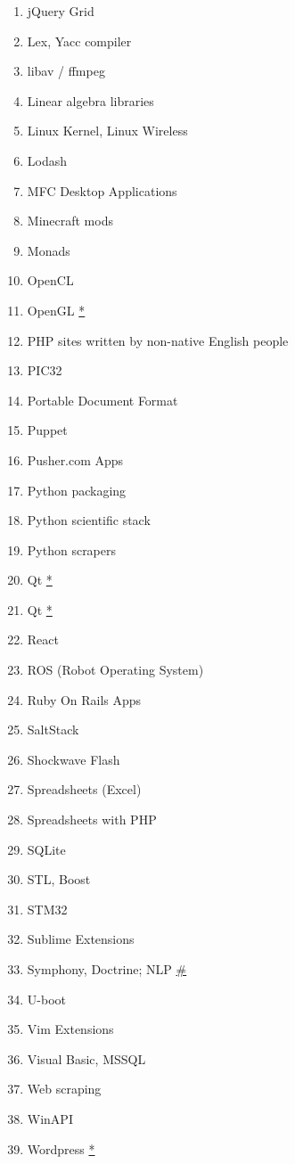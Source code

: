 \documentclass[conference,10pt]{IEEEtran}
\begin{document}
\begin{figure}[H]
\begin{multicols}{2}
\begin{enumerate}
    \item jQuery Grid
    \item Lex, Yacc compiler
    \item libav / ffmpeg
    \item Linear algebra libraries
    \item Linux Kernel, Linux Wireless
    \item Lodash
    \item MFC Desktop Applications 
    \item Minecraft mods
    \item Monads
    \item OpenCL
    \item OpenGL \hyperref[duplicate]{*}
    \item PHP sites written by non-native English people
    \item PIC32
    \item Portable Document Format
    \item Puppet
    \item Pusher.com Apps
    \item Python packaging
    \item Python scientific stack
    \item Python scrapers
    \item Qt \hyperref[duplicate]{*}
    \item Qt \hyperref[duplicate]{*}
    \item React
    \item ROS (Robot Operating System)
    \item Ruby On Rails Apps 
    \item SaltStack
    \item Shockwave Flash
    \item Spreadsheets (Excel)
    \item Spreadsheets with PHP
    \item SQLite
    \item STL, Boost
    \item STM32
    \item Sublime Extensions
    \item Symphony, Doctrine; NLP \hyperref[dual]{\#}
    \item U-boot
    \item Vim Extensions
    \item Visual Basic, MSSQL
    \item Web scraping
    \item WinAPI
    \item Wordpress \hyperref[duplicate]{*}

\end{enumerate}
\end{multicols}
\end{figure}
\end{document}
